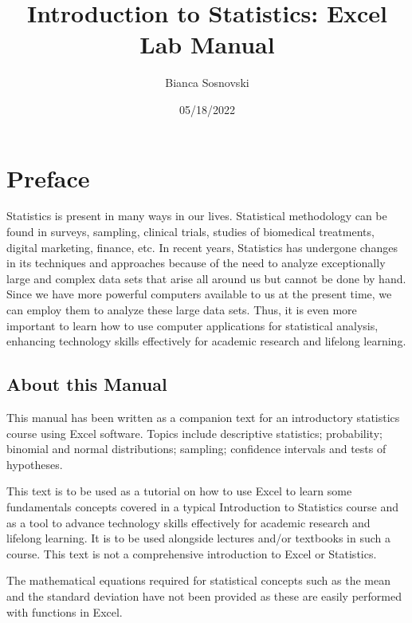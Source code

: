 \documentclass[
]{book}
\title{Introduction to Statistics: Excel Lab Manual}
\author{Bianca Sosnovski}
\date{05/18/2022}
\begin{document}
\maketitle

{
\setcounter{tocdepth}{2}
\tableofcontents
}
\hypertarget{preface}{%
\chapter*{Preface}\label{preface}}

Statistics is present in many ways in our lives. Statistical methodology can be found in surveys, sampling, clinical trials, studies of biomedical treatments, digital marketing, finance, etc. In recent years, Statistics has undergone changes in its techniques and approaches because of the need to analyze exceptionally large and complex data sets that arise all around us but cannot be done by hand. Since we have more powerful computers available to us at the present time, we can employ them to analyze these large data sets. Thus, it is even more important to learn how to use computer applications for statistical analysis, enhancing technology skills effectively for academic research and lifelong learning.

\hypertarget{about-this-manual}{%
\section*{About this Manual}\label{about-this-manual}}

This manual has been written as a companion text for an introductory statistics course using Excel software. Topics include descriptive statistics; probability; binomial and normal distributions; sampling; confidence intervals and tests of hypotheses.

This text is to be used as a tutorial on how to use Excel to learn some fundamentals concepts covered in a typical Introduction to Statistics course and as a tool to advance technology skills effectively for academic research and lifelong learning. It is to be used alongside lectures and/or textbooks in such a course. This text is not a comprehensive introduction to Excel or Statistics.

The mathematical equations required for statistical concepts such as the mean and the standard deviation have not been provided as these are easily performed with functions in Excel.
\end{document}
